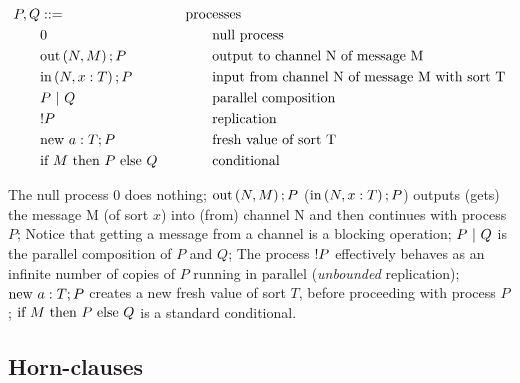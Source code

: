 \begin{equation}
  \label{eq:apic-processes}
  \begin{aligned}
    P, Q & ::=                 \\
         & 0                   \\
         & \mbox{out}\left(N, M\right); P   \\
         & \mbox{in}\left(N, x: T\right); P \\
         & P\ |\ Q       \\
         & !P         \\
         & \mbox{new}\ a: T; P   \\
         & \mbox{if}\ M\ \mbox{then}\ P\ \mbox{else}\ Q
  \end{aligned}
  \qquad
  \begin{aligned}
    \mbox{proc} & \mbox{esses}                                         \\
                & \mbox{null process}                                  \\
                & \mbox{output to channel N of message M}              \\
                & \mbox{input from channel N of message M with sort T} \\
                & \mbox{parallel composition}                          \\
                & \mbox{replication}                                   \\
                & \mbox{fresh value of sort T}                         \\
                & \mbox{conditional}
  \end{aligned}
\end{equation}

The null process $0$ does nothing;
$\mbox{out}\left(N, M\right); P$ ($\mbox{in}\left(N, x: T\right); P$) outputs (gets) the message M (of sort $x$) into (from) channel N and then continues with process $P$; Notice that getting a message from a channel is a blocking operation;
$P\ |\ Q$ is the parallel composition of $P$ and $Q$;
The process $!P$ effectively behaves as an infinite number of copies of $P$ running in parallel (\textit{unbounded} replication);
$\mbox{new}\ a: T; P$ creates a new fresh value of sort $T$, before proceeding with process $P$;
$\mbox{if}\ M\ \mbox{then}\ P\ \mbox{else}\ Q$ is a standard conditional.


\subsection{Horn-clauses}







